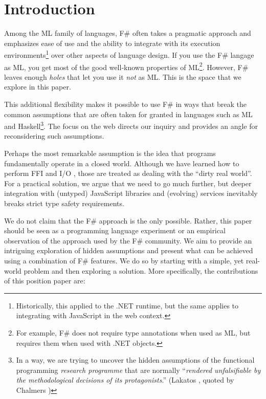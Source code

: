 \documentclass[submission,copyright,creativecommons]{eptcs}
\begin{document}
\section{Introduction}

Among the ML family of languages, F\# often takes a pragmatic approach and emphasizes ease of use
and the ability to integrate with its execution environments\footnote{Historically, this applied 
to the .NET runtime, but the same applies to integrating with JavaScript in the web context.} over 
other aspects of language design. If you use the F\# langage as ML, you get most of the good 
well-known properties of ML\footnote{For example, F\# does not require type annotations when used 
as ML, but requires them when used with .NET objects.}. However, F\# leaves enough \emph{holes} that
let you use it \emph{not} as ML. This is the space that we explore in this paper.

This additional flexibility makes it possible to use F\# in ways that break the common assumptions
that are often taken for granted in languages such as ML and Haskell\footnote{In a way, we are trying
to uncover the hidden assumptions of the functional programming \emph{research programme} that are
normally ``\emph{rendered unfalsifiable by the methodological decisions of its protagonists}.'' 
(Lakatos \cite{philosophy-lakatos}, quoted by Chalmers \cite{philosophy-thing})}. The focus on 
the web directs our inquiry and provides an angle for reconsidering such assumptions. 

Perhaps the most remarkable assumption is the idea that programs fundamentally operate in a closed
world. Although we have learned how to perform FFI and I/O \cite{haskell-ffi,haskell-imperative},
those are treated as dealing with the ``dirty real world''. For a practical solution, we argue that
we need to go much further, but deeper integration with (untyped) JavaScript libraries and (evolving) 
services inevitably breaks strict type safety requirements.

We do not claim that the F\# approach is the only possible. Rather, this paper should be seen
as a programming language experiment \cite{philosophy-pl} or an empirical observation of the 
approach used by the F\# community. We aim to provide an intriguing exploration of hidden assumptions 
and present what can be achieved using a combination of F\# features. We do so by starting with 
a simple, yet real-world problem and then exploring a solution. More specifically, the contributions 
of this position paper are:
\end{document}
